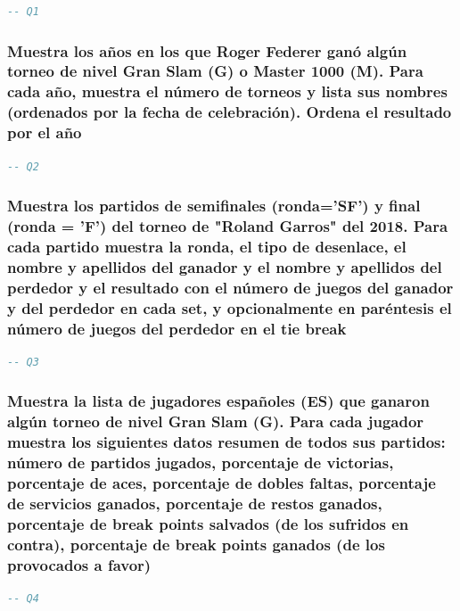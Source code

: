 \documentclass[11pt]{opticajnl}
\begin{document}
\begin{lstlisting}[language=SQL]
-- Q1
\end{lstlisting}





\subsubsection{Muestra los años en los que Roger Federer ganó algún torneo de nivel Gran Slam (G) o Master 1000 (M). Para cada año, muestra el número de torneos y lista sus nombres (ordenados por la fecha de celebración). Ordena el resultado por el año}

\begin{lstlisting}[language=SQL]
-- Q2
\end{lstlisting}





\subsubsection{Muestra los partidos de semiﬁnales (ronda='SF') y ﬁnal (ronda = 'F') del torneo de "Roland Garros" del 2018. Para cada partido muestra la ronda, el tipo de desenlace, el nombre y apellidos del ganador y el nombre y apellidos del perdedor y el resultado con el número de juegos del ganador y del perdedor en cada set, y opcionalmente en paréntesis el número de juegos del perdedor en el tie break}

\begin{lstlisting}[language=SQL]
-- Q3
\end{lstlisting}





\subsubsection{Muestra la lista de jugadores españoles (ES) que ganaron algún torneo de nivel Gran Slam (G). Para cada jugador muestra los siguientes datos resumen de todos sus partidos: número de partidos jugados, porcentaje de victorias, porcentaje de aces, porcentaje de dobles faltas, porcentaje de servicios ganados, porcentaje de restos ganados, porcentaje de break points salvados (de los sufridos en contra), porcentaje de break points ganados (de los provocados a favor)}

\begin{lstlisting}[language=SQL]
-- Q4
\end{lstlisting}
\end{document}
